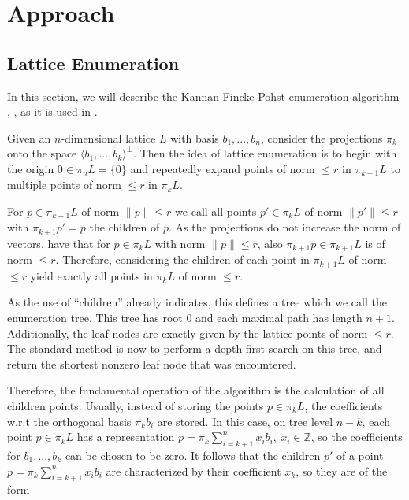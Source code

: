 \documentclass{scrartcl}
\newcommand{\Z}{\mathbb{Z}}
\begin{document}
    \section{Approach}

    \label{sec:enumeration}

    \subsection{Lattice Enumeration}

    In this section, we will describe the Kannan-Fincke-Pohst enumeration algorithm \cite{enum1}, \cite{enum}, as it is used in \cite{fplll}.

    Given an $n$-dimensional lattice $L$ with basis $b_1, ..., b_n$, consider the projections $\pi_k$ onto the space $\langle b_1, ..., b_k \rangle^\perp$. Then the idea of lattice enumeration is to begin with the origin $0 \in \pi_n L = \{ 0 \}$ and repeatedly expand points of norm $\leq r$ in $\pi_{k + 1} L$ to multiple points of norm $\leq r$ in $\pi_k L$.
    
    For $p \in \pi_{k + 1} L$ of norm $\| p \| \leq r$ we call all points $p' \in \pi_k L$ of norm $\| p' \| \leq r$ with $\pi_{k + 1} p' = p$ the children of $p$. As the projections do not increase the norm of vectors, have that for $p \in \pi_k L$ with norm $\| p \| \leq r$, also $\pi_{k + 1} p \in \pi_{k + 1}L$ is of norm $\leq r$. Therefore, considering the children of each point in $\pi_{k + 1}L$ of norm $\leq r$ yield exactly all points in $\pi_k L$ of norm $\leq r$.

    As the use of ``children'' already indicates, this defines a tree which we call the enumeration tree. This tree has root $0$ and each maximal path has length $n + 1$. Additionally, the leaf nodes are exactly given by the lattice points of norm $\leq r$.
    The standard method is now to perform a depth-first search on this tree, and return the shortest nonzero leaf node that was encountered.

    Therefore, the fundamental operation of the algorithm is the calculation of all children points. Usually, instead of storing the points $p \in \pi_k L$, the coefficients w.r.t the orthogonal basis $\pi_k b_i$ are stored. In this case, on tree level $n - k$, each point $p \in \pi_k L$ has a representation $p = \pi_k \sum_{i = k + 1}^n x_i b_i , \ x_i \in \Z$, so the coefficients for $b_1, ..., b_k$ can be chosen to be zero. It follows that the children $p'$ of a point $p = \pi_k \sum_{i = k + 1}^n x_i b_i$ are characterized by their coefficient $x_k$, so they are of the form
    
\end{document}
